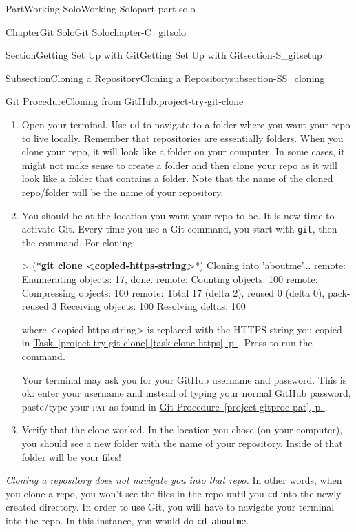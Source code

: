 \documentclass[twoside,10pt,]{book}
\newcommand{\xreffont}{\relax}
\newcommand{\mono}[1]{\texttt{#1}}
\newcommand{\acronym}[1]{\textsc{\MakeLowercase{#1}}}
\newcommand{\consoleinput}[1]{\textbf{#1}}
\newcommand{\kbd}[1]{\keys{{#1}}}
\begin{document}
\begin{partptx}{Part}{Working Solo}{}{Working Solo}{}{}{part-part-solo}
\begin{chapterptx}{Chapter}{Git Solo}{}{Git Solo}{}{}{chapter-C_gitsolo}
\begin{sectionptx}{Section}{Getting Set Up with Git}{}{Getting Set Up with Git}{}{}{section-S_gitsetup}
\begin{subsectionptx}{Subsection}{Cloning a Repository}{}{Cloning a Repository}{}{}{subsection-SS_cloning}
\begin{project}{Git Procedure}{Cloning from GitHub.}{project-try-git-clone}
\begin{enumerate}[font=\bfseries,label=(\alph*),ref=\alph*]
\item{}Open your terminal. Use \mono{cd} to navigate to a folder where you want your repo to live locally. Remember that repositories are essentially folders. When you clone your repo, it will look like a folder on your computer. In some cases, it might not make sense to create a folder and then clone your repo as it will look like a folder that contains a folder. Note that the name of the cloned repo\slash{}folder will be the name of your repository.%
\item{}You should be at the location you want your repo to be. It is now time to activate Git. Every time you use a Git command, you start with \mono{git}, then the command. For cloning:%
\begin{console}{0}{1}{0}
> (*\consoleinput{git clone <copied-https-string>}*)
Cloning into 'aboutme'...
remote: Enumerating objects: 17, done.
remote: Counting objects: 100%
remote: Compressing objects: 100%
remote: Total 17 (delta 2), reused 0 (delta 0), pack-reused 3
Receiving objects: 100%
Resolving deltas: 100%
\end{console}
where \textless{}copied-https-string\textgreater{} is replaced with the HTTPS string you copied in \hyperref[task-clone-https]{Task~{\xreffont\ref{project-try-git-clone}}.{\xreffont\ref{task-clone-https}}, p.\,\pageref{task-clone-https}}. Press \kbd{Enter} to run the command.%
\par
Your terminal may ask you for your GitHub username and password. This is ok: enter your username and instead of typing your normal GitHub password, paste\slash{}type your \acronym{PAT} as found in \hyperref[project-gitproc-pat]{Git Procedure~{\xreffont\ref{project-gitproc-pat}}, p.\,\pageref{project-gitproc-pat}}.%
\item{}Verify that the clone worked. In the location you chose (on your computer), you should see a new folder with the name of your repository. Inside of that folder will be your files!%
\end{enumerate}%
\end{project}%
\emph{Cloning a repository does not navigate you into that repo.} In other words, when you clone a repo, you won't see the files in the repo until you \mono{cd} into the newly-created directory. In order to use Git, you will have to navigate your terminal into the repo. In this instance, you would do \mono{cd aboutme}.%
\end{subsectionptx}
%
%
\typeout{************************************************}

\end{sectionptx}
\end{chapterptx}
\end{partptx}
\end{document}
